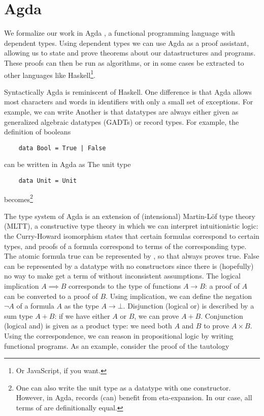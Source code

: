 \section{Agda}
We formalize our work in Agda \cite{agda}, a functional programming language with dependent types. Using dependent types we can use Agda as a proof assistant, allowing us to state and prove theorems about our datastructures and programs. These proofs can then be run as algorithms, or in some cases be extracted to other languages like Haskell\footnote{Or JavaScript, if you want.}.

Syntactically Agda is reminiscent of Haskell. One difference is that Agda allows most characters and words in identifiers with only a small set of exceptions. For example, we can write
Another is that datatypes are always either given as generalized algebraic datatypes (GADTs) or record types. For example, the definition of booleans
\begin{verbatim}
    data Bool = True | False
\end{verbatim}
can be written in Agda as
The unit type
\begin{verbatim}
    data Unit = Unit
\end{verbatim}
becomes\footnote{One can also write the unit type as a datatype with one constructor. However, in Agda, records (can) benefit from eta-expansion. In our case, all terms of  are definitionally equal.}

The type system of Agda is an extension of (intensional) Martin-Löf type theory (MLTT), a constructive type theory in which we can interpret intuitionistic logic: the Curry-Howard isomorphism states that certain formulas correspond to certain types, and proofs of a formula correspond to terms of the corresponding type. The atomic formula true can be represented by , so that  always proves true. False can be represented by a datatype with no constructors
since there is (hopefully) no way to make get a term of  without inconsistent assumptions. The logical implication $A \implies B$ corresponds to the type of functions $A \to B$: a proof of $A$ can be converted to a proof of $B$. Using implication, we can define the negation $\lnot A$ of a formula $A$ as the type $A \to \bot$. Disjunction (logical or) is described by a sum type $A + B$:
if we have either $A$ or $B$, we can prove $A + B$. Conjunction (logical and) is given as a product type:
we need both $A$ and $B$ to prove $A \times B$. Using the correspondence, we can reason in propositional logic by writing functional programs. As an example, consider the proof of the tautology 

